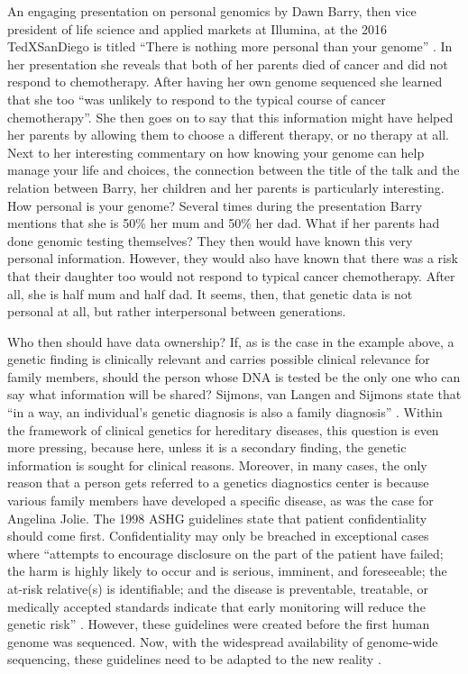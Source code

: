 An engaging presentation on personal genomics by Dawn Barry, then vice president of life science and applied markets at Illumina, at the 2016 TedXSanDiego is titled “There is nothing more personal than your genome” \cite{Barry_2016}. 
In her presentation she reveals that both of her parents died of cancer and did not respond to chemotherapy. 
After having her own genome sequenced she learned that she too “was unlikely to respond to the typical course of cancer chemotherapy”. 
She then goes on to say that this information might have helped her parents by allowing them to choose a different therapy, or no therapy at all. 
Next to her interesting commentary on how knowing your genome can help manage your life and choices, the connection between the title of the talk and the relation between Barry, her children and her parents is particularly interesting. 
How personal is your genome? 
Several times during the presentation Barry mentions that she is 50\% her mum and 50\% her dad. 
What if her parents had done genomic testing themselves? They then would have known this very personal information. 
However, they would also have known that there was a risk that their daughter too would not respond to typical cancer chemotherapy. 
After all, she is half mum and half dad. 
It seems, then, that genetic data is not personal at all, but rather interpersonal between generations. 

Who then should have data ownership? 
If, as is the case in the example above, a genetic finding is clinically relevant and carries possible clinical relevance for family members, should the person whose DNA is tested be the only one who can say what information will be shared? 
Sijmons, van Langen and Sijmons state that “in a way, an individual’s genetic diagnosis is also a family diagnosis” \cite{Sijmons_2011}. 
Within the framework of clinical genetics for hereditary diseases, this question is even more pressing, because here, unless it is a secondary finding, the genetic information is sought for clinical reasons. 
Moreover, in many cases, the only reason that a person gets referred to a genetics diagnostics center is because various family members have developed a specific disease, as was the case for Angelina Jolie. 
The 1998 ASHG guidelines state that patient confidentiality should come first. 
Confidentiality may only be breached in exceptional cases where “attempts to encourage disclosure on the part of the patient have failed; the harm is highly likely to occur and is serious, imminent, and foreseeable; the at-risk relative(s) is identifiable; and the disease is preventable, treatable, or medically accepted standards indicate that early monitoring will reduce the genetic risk” \cite{Knoppers_1998}. 
However, these guidelines were created before the first human genome was sequenced. Now, with the widespread availability of genome-wide sequencing, these guidelines need to be adapted to the new reality \cite{Wolf_2015}.

